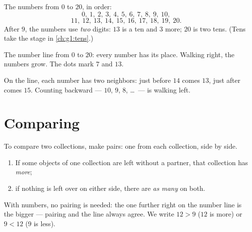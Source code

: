 \begin{example}\label{ex:g1:counting:writing}
The numbers from $0$ to $20$, in order:
\[
0,\ 1,\ 2,\ 3,\ 4,\ 5,\ 6,\ 7,\ 8,\ 9,\ 10,
\]
\[
11,\ 12,\ 13,\ 14,\ 15,\ 16,\ 17,\ 18,\ 19,\ 20 .
\]
After $9$, the numbers use \emph{two} digits: $13$ is a ten and $3$
more; $20$ is two tens. (Tens take the stage in
\cref{ch:g1:tens}.)
\end{example}

\begin{omfigure}

{\small The number line from $0$ to $20$: every number has its place.
Walking right, the numbers grow. The dots mark $7$ and $13$.}
\end{omfigure}

\begin{example}\label{ex:g1:counting:neighbors}
On the line, each number has two neighbors: just before $14$ comes
$13$, just after comes $15$. Counting backward --- $10$, $9$, $8$,
\dots\ --- is walking left.
\end{example}

\section{Comparing}

\begin{method}\label{met:g1:counting:compare}
To compare two collections, make pairs: one from each collection,
side by side.
\begin{enumerate}
  \item If some objects of one collection are left without a partner,
        that collection has \emph{more};
  \item if nothing is left over on either side, there are
        \emph{as many} on both.
\end{enumerate}
With numbers, no pairing is needed: the one further right on the
number line is the bigger --- pairing and the line always agree. We
write $12 > 9$ ($12$ is more) or $9 < 12$ ($9$ is less).
\end{method}

